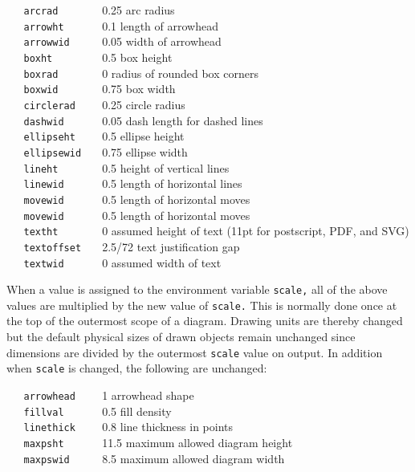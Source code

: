 {\tt \ \ \ arcrad\ \ \ \ \ \ \ }
0.25   arc radius
\\\hbox{}\hskip-1pt
{\tt \ \ \ arrowht\ \ \ \ \ \ }
0.1    length of arrowhead
\\\hbox{}\hskip-1pt
{\tt \ \ \ arrowwid\ \ \ \ \ }
0.05   width of arrowhead
\\\hbox{}\hskip-1pt
{\tt \ \ \ boxht\ \ \ \ \ \ \ \ }
0.5    box height
\\\hbox{}\hskip-1pt
{\tt \ \ \ boxrad\ \ \ \ \ \ \ }
0      radius of rounded box corners
\\\hbox{}\hskip-1pt
{\tt \ \ \ boxwid\ \ \ \ \ \ \ }
0.75   box width
\\\hbox{}\hskip-1pt
{\tt \ \ \ circlerad\ \ \ \ }
0.25   circle radius
\\\hbox{}\hskip-1pt
{\tt \ \ \ dashwid\ \ \ \ \ \ }
0.05   dash length for dashed lines
\\\hbox{}\hskip-1pt
{\tt \ \ \ ellipseht\ \ \ \ }
0.5    ellipse height
\\\hbox{}\hskip-1pt
{\tt \ \ \ ellipsewid\ \ \ }
0.75   ellipse width
\\\hbox{}\hskip-1pt
{\tt \ \ \ lineht\ \ \ \ \ \ \ }
0.5    height of vertical lines
\\\hbox{}\hskip-1pt
{\tt \ \ \ linewid\ \ \ \ \ \ }
0.5    length of horizontal lines
\\\hbox{}\hskip-1pt
{\tt \ \ \ movewid\ \ \ \ \ \ }
0.5    length of horizontal moves
\\\hbox{}\hskip-1pt
{\tt \ \ \ movewid\ \ \ \ \ \ }
0.5    length of horizontal moves
\\\hbox{}\hskip-1pt
{\tt \ \ \ textht\ \ \ \ \ \ \ }
0      assumed height of text (11pt for postscript, PDF, and SVG)
\\\hbox{}\hskip-1pt
{\tt \ \ \ textoffset\ \ \ }
2.5/72 text justification gap
\\\hbox{}\hskip-1pt
{\tt \ \ \ textwid\ \ \ \ \ \ }
0      assumed width of text

When a value is assigned to the environment variable
{\tt scale,}
all of the above values are multiplied by the new value of
{\tt scale.}
This is normally done once at the top of the outermost scope of a diagram.
Drawing units are thereby changed but the default physical sizes of
drawn objects remain unchanged since dimensions are divided by the outermost
{\tt scale}
value on output.
In addition when
{\tt scale}
is changed, the following are unchanged:

{\tt \ \ \ arrowhead\ \ \ \ }
1      arrowhead shape
\\\hbox{}\hskip-1pt
{\tt \ \ \ fillval\ \ \ \ \ \ }
0.5    fill density
\\\hbox{}\hskip-1pt
{\tt \ \ \ linethick\ \ \ \ }
0.8    line thickness in points
\\\hbox{}\hskip-1pt
{\tt \ \ \ maxpsht\ \ \ \ \ \ }
11.5   maximum allowed diagram height
\\\hbox{}\hskip-1pt
{\tt \ \ \ maxpswid\ \ \ \ \ }
8.5    maximum allowed diagram width

